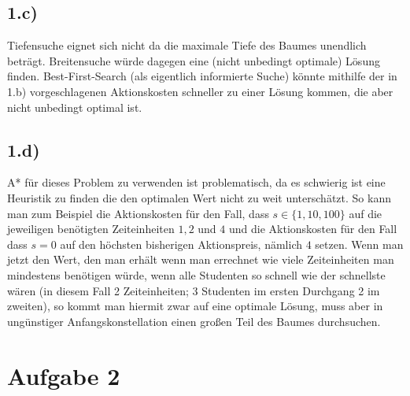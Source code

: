 \documentclass[a4paper]{article}
\begin{document}
\subsection*{1.c)}
Tiefensuche eignet sich nicht da die maximale Tiefe des Baumes unendlich beträgt. Breitensuche würde dagegen eine (nicht unbedingt optimale) Lösung finden. Best-First-Search (als eigentlich informierte Suche) könnte mithilfe der in 1.b) vorgeschlagenen Aktionskosten schneller zu einer Lösung kommen, die aber nicht unbedingt optimal ist.

\subsection*{1.d)}
A* für dieses Problem zu verwenden ist problematisch, da es schwierig ist eine Heuristik zu finden die den optimalen Wert nicht zu weit unterschätzt. So kann man zum Beispiel die Aktionskosten für den Fall, dass $s \in \{1,10,100\}$ auf die jeweiligen benötigten Zeiteinheiten $1, 2$ und $4$ und die Aktionskosten für den Fall dass $s=0$ auf den höchsten bisherigen Aktionspreis, nämlich $4$ setzen. Wenn man jetzt den Wert, den man erhält wenn man errechnet wie viele Zeiteinheiten man mindestens benötigen würde, wenn alle Studenten so schnell wie der schnellste wären (in diesem Fall 2 Zeiteinheiten; 3 Studenten im ersten Durchgang 2 im zweiten), so kommt man hiermit zwar auf eine optimale Lösung, muss aber in ungünstiger Anfangskonstellation einen großen Teil des Baumes durchsuchen.

\section*{Aufgabe 2}
\end{document}
